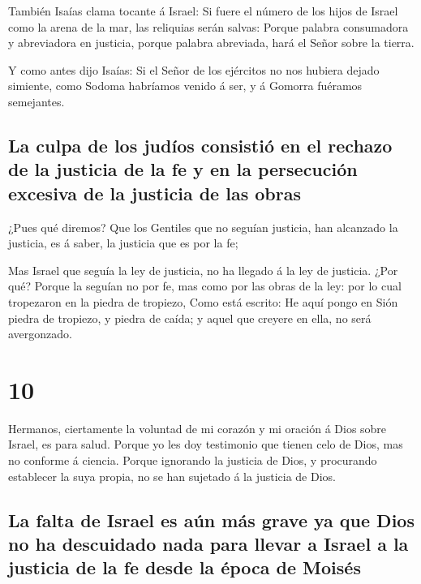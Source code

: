  También Isaías clama tocante á Israel: Si fuere el
número de los hijos de Israel como la arena de la mar, las reliquias
serán salvas:  Porque palabra consumadora y abreviadora
en justicia, porque palabra abreviada, hará el Señor sobre la tierra.

 Y como antes dijo Isaías: Si el Señor de los ejércitos
no nos hubiera dejado simiente, como Sodoma habríamos venido á ser, y á
Gomorra fuéramos semejantes.

\hypertarget{la-culpa-de-los-juduxedos-consistiuxf3-en-el-rechazo-de-la-justicia-de-la-fe-y-en-la-persecuciuxf3n-excesiva-de-la-justicia-de-las-obras}{%
\subsection{La culpa de los judíos consistió en el rechazo de la
justicia de la fe y en la persecución excesiva de la justicia de las
obras}\label{la-culpa-de-los-juduxedos-consistiuxf3-en-el-rechazo-de-la-justicia-de-la-fe-y-en-la-persecuciuxf3n-excesiva-de-la-justicia-de-las-obras}}

 ¿Pues qué diremos? Que los Gentiles que no seguían
justicia, han alcanzado la justicia, es á saber, la justicia que es por
la fe;

 Mas Israel que seguía la ley de justicia, no ha llegado
á la ley de justicia.  ¿Por qué? Porque la seguían no por
fe, mas como por las obras de la ley: por lo cual tropezaron en la
piedra de tropiezo,  Como está escrito: He aquí pongo en
Sión piedra de tropiezo, y piedra de caída; y aquel que creyere en ella,
no será avergonzado.

\hypertarget{section-45-10}{%
\section{10}\label{section-45-10}}

 Hermanos, ciertamente la voluntad de mi corazón y mi
oración á Dios sobre Israel, es para salud.  Porque yo les
doy testimonio que tienen celo de Dios, mas no conforme á ciencia.
 Porque ignorando la justicia de Dios, y procurando
establecer la suya propia, no se han sujetado á la justicia de Dios.

\hypertarget{la-falta-de-israel-es-auxfan-muxe1s-grave-ya-que-dios-no-ha-descuidado-nada-para-llevar-a-israel-a-la-justicia-de-la-fe-desde-la-uxe9poca-de-moisuxe9s}{%
\subsection{La falta de Israel es aún más grave ya que Dios no ha
descuidado nada para llevar a Israel a la justicia de la fe desde la
época de
Moisés}\label{la-falta-de-israel-es-auxfan-muxe1s-grave-ya-que-dios-no-ha-descuidado-nada-para-llevar-a-israel-a-la-justicia-de-la-fe-desde-la-uxe9poca-de-moisuxe9s}}

